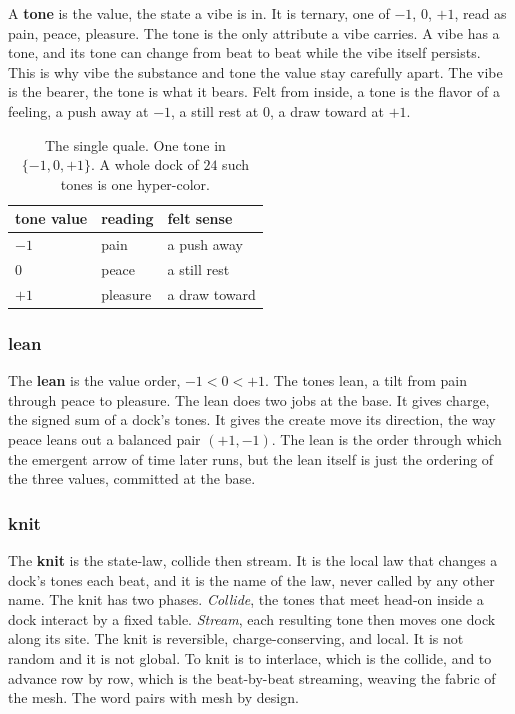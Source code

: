 A \textbf{tone} is the value, the state a vibe is in. It is ternary, one of $-1$, $0$, $+1$, read as pain, peace, pleasure. The tone is the only attribute a vibe carries. A vibe has a tone, and its tone can change from beat to beat while the vibe itself persists. This is why vibe the substance and tone the value stay carefully apart. The vibe is the bearer, the tone is what it bears. Felt from inside, a tone is the flavor of a feeling, a push away at $-1$, a still rest at $0$, a draw toward at $+1$.

\begin{table}[ht]
\centering
\begin{tabular}{@{}lll@{}}
\toprule
tone value & reading & felt sense \\
\midrule
$-1$ & pain & a push away \\
$0$ & peace & a still rest \\
$+1$ & pleasure & a draw toward \\
\bottomrule
\end{tabular}
\caption{The single quale. One tone in $\{-1, 0, +1\}$. A whole dock of $24$ such tones is one hyper-color.}
\label{tab:one-tone}
\end{table}

\subsubsection{lean}

The \textbf{lean} is the value order, $-1 < 0 < +1$. The tones lean, a tilt from pain through peace to pleasure. The lean does two jobs at the base. It gives charge, the signed sum of a dock's tones. It gives the create move its direction, the way peace leans out a balanced pair $(+1, -1)$. The lean is the order through which the emergent arrow of time later runs, but the lean itself is just the ordering of the three values, committed at the base.

\subsubsection{knit}

The \textbf{knit} is the state-law, collide then stream. It is the local law that changes a dock's tones each beat, and it is the name of the law, never called by any other name. The knit has two phases. \emph{Collide}, the tones that meet head-on inside a dock interact by a fixed table. \emph{Stream}, each resulting tone then moves one dock along its site. The knit is reversible, charge-conserving, and local. It is not random and it is not global. To knit is to interlace, which is the collide, and to advance row by row, which is the beat-by-beat streaming, weaving the fabric of the mesh. The word pairs with mesh by design.


